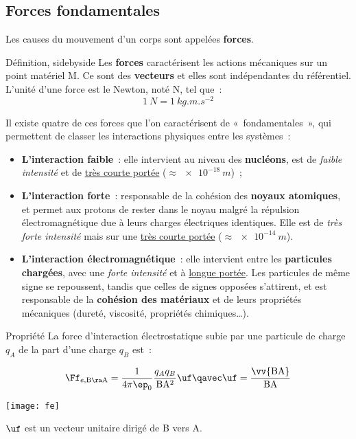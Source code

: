 \documentclass[../main/main.tex]{subfiles}
\begin{document}
\subsection{Forces fondamentales}
Les causes du mouvement d'un corps sont appelées \textbf{forces}.
\begin{tdefi}{Définition, sidebyside}
    Les \textbf{forces} caractérisent les actions mécaniques sur un point
    matériel M. Ce sont des \textbf{vecteurs} et elles sont indépendantes du
    référentiel.
    \tcblower
    L'unité d'une force est le Newton, noté N, tel que~:
    \[\boxed{\SI{1}{N} = \SI{1}{kg.m.s^{-2}}}\]
\end{tdefi}
Il existe quatre de ces forces que l'on caractérisent de «~fondamentales~», qui
permettent de classer les interactions physiques entre les systèmes~: \bigbreak
\begin{itemize}
    \item \textbf{L'interaction faible}~: elle intervient au niveau des
        \textbf{nucléons}, est de \textit{faible intensité} et de
        \underline{très courte portée} ($\approx \SI{e-18}{m}$)~;
    \item \textbf{L'interaction forte}~: responsable de la cohésion des
        \textbf{noyaux atomiques}, et permet aux protons de rester dans
        le noyau
        malgré la répulsion électromagnétique due à leurs charges électriques
        identiques. Elle est de \textit{très forte intensité} mais sur une
        \underline{très courte portée} ($\approx \SI{e-14}{m}$).
    \item \textbf{L'interaction électromagnétique}~: elle intervient entre les
        \textbf{particules chargées}, avec une \textit{forte intensité} et à
        \underline{longue portée}. Les particules de même signe se repoussent,
        tandis que celles de signes opposées s'attirent, et est responsable de
        la \textbf{cohésion des matériaux} et de leurs propriétés mécaniques
        (dureté, viscosité, propriétés chimiques…).
\end{itemize}
\begin{tprop}{Propriété}
    La force d'interaction électrostatique subie par une particule de charge
    $q_A$ de la part d'une charge $q_B$ est~: \smallbreak
    \begin{minipage}{0.45\linewidth}
        \[\Ff_{e,\rm B\ra A} = \frac{1}{4\pi\ep_0} \frac{q_Aq_B}{\rm BA^2}\uf
        \qavec
        \uf = \frac{\vv{\rm BA}}{\rm BA}\]
    \end{minipage}
    \hfill
    \begin{minipage}{0.45\linewidth}
        \begin{center}
            \texttt{[image: fe]}
        \end{center}
    \end{minipage}

    \bigbreak$\uf$ est un vecteur unitaire dirigé de B vers A.
\end{tprop}
\end{document}
